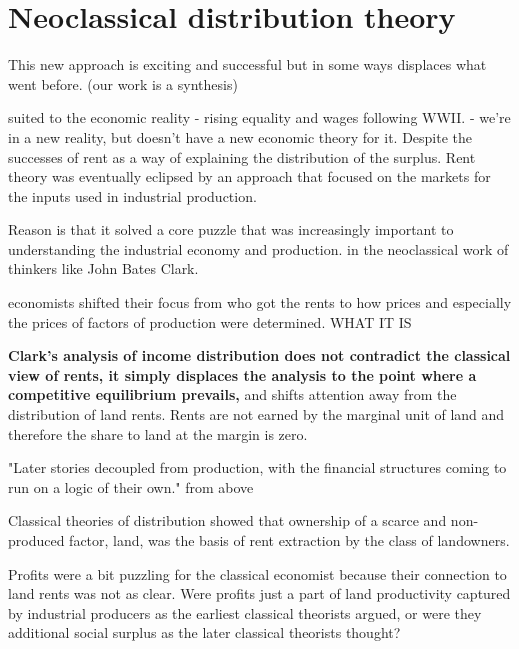 \section{Neoclassical distribution theory}

This new approach is exciting and successful but in some ways displaces what went before.
(our work is a synthesis)

suited to the economic reality - rising equality and wages following WWII. - 
we're in a new reality, but doesn't have a new economic theory for it. 
 Despite the successes of rent as a way of explaining the distribution of the surplus. %
 Rent theory was eventually eclipsed by an approach that focused on the markets for the inputs used in industrial production.

 Reason is that it solved a core puzzle that was increasingly important to understanding the industrial economy and production.
in the neoclassical work of thinkers like John Bates Clark.


economists shifted their focus from who got the rents to how prices and especially the prices of factors of production were determined.  
WHAT IT IS 

\textbf{Clark's analysis of income distribution does not contradict the classical view of rents, it simply displaces the analysis to the point where a competitive equilibrium prevails,} and shifts attention away from the distribution of land rents. Rents are not earned by the marginal unit of land and therefore the share to land at the margin is zero. 


"Later stories decoupled from production, with the financial structures coming to run on a logic of their own." from above


Classical theories of distribution showed that ownership of a scarce and non-produced factor, land, was the  basis of rent extraction by the class of landowners. 

Profits were a bit puzzling for the classical economist because their connection to land rents was not as clear. Were profits just a part of land productivity captured by industrial producers as the earliest classical theorists argued, or were they  additional social surplus as the later classical theorists thought? %

